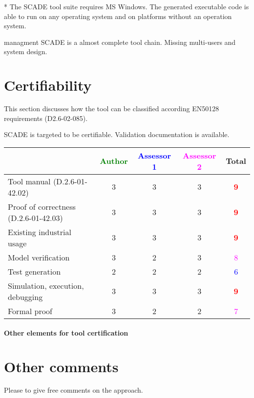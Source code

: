 \begin{author_comment}
* The SCADE tool suite requires MS Windows. The generated executable code is able to run on any operating system and on platforms without an operation system.   
\end{author_comment}

\begin{assessor2}managment
SCADE is a almost complete tool chain. Missing multi-users and system design.
\end{assessor2}
\section{Certifiability}

This section discusses how the tool can be classified according EN50128 requirements (D2.6-02-085).

\begin{author_comment}
SCADE is targeted to be certifiable. Validation documentation is available.   
\end{author_comment}


\begin{tabular}{|l | c | c | c | c|}
\hline
& \textcolor{green}{Author} & \textcolor{blue}{Assessor 1} & \textcolor{magenta}{Assessor 2} & Total \\
\hline 
Tool manual (D.2.6-01-42.02) & 3     & 3     &3 & \textcolor{red}{\textbf{9}} \\
\hline
Proof of correctness (D.2.6-01-42.03)   & 3     & 3     &3 & \textcolor{red}{\textbf{9}} \\
\hline
Existing industrial  usage  & 3     & 3     &3 & \textcolor{red}{\textbf{9}} \\
\hline
Model verification & 3     & 2     &3 & \textcolor{magenta}{8} \\
\hline
Test generation & 2     & 2     &2 & \textcolor{blue}{6} \\
\hline
Simulation, execution, debugging & 3     & 3     &3 & \textcolor{red}{\textbf{9}} \\
\hline
Formal proof & 3     & 2     &2 & \textcolor{magenta}{7} \\
\hline
\end{tabular}

\paragraph{Other elements for tool certification}

\section{Other comments}
Please to  give free comments on the approach.




